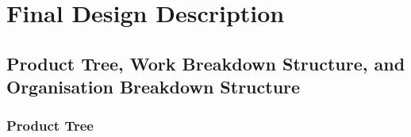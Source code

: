 %
%
%

\section{Final Design Description}
\label{sec:design}

\subsection{Product Tree, Work Breakdown Structure, and Organisation Breakdown Structure}
\label{subsec:pt_wbs_obs}

\subsubsection{Product Tree}
\label{subsubsec:product_tree}


